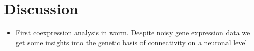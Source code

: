 \documentclass[10pt,letterpaper]{article}
\begin{document}

%
%
%
%
%

\section*{Discussion}
\begin{itemize}
    \item{First coexpression analysis in worm. Despite noisy gene expression data we get some insights into the genetic basis of connectivity on a neuronal level}
\end{itemize}
\end{document}
